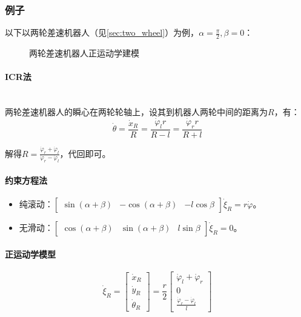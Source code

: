 \documentclass[
12pt, %
a4paper, 
oneside, %
headinclude,footinclude, %
]{scrartcl}
\begin{document}
\subsubsection{例子}\label{sec:example1}
以下以两轮差速机器人（见\ref{sec:two_wheel}）为例，$ \alpha = \frac{\pi}{2}, \beta = 0 $：
\begin{figure}[H]
\centering
{} \quad
{}
\caption[两轮差速机器人正运动学建模]{两轮差速机器人正运动学建模}
\end{figure}
\paragraph{ICR法}~\\

两轮差速机器人的瞬心在两轮轮轴上，设其到机器人两轮中间的距离为$ R $，有：
$$ \dot{\theta} = \frac{\dot{x}_R}{R} = \frac{\dot{\varphi}_l r}{R-l} = \frac{\dot{\varphi}_r r}{R+l} $$

解得$ R = \frac{\dot{\varphi}_r + \dot{\varphi}_l}{\dot{\varphi}_r - \dot{\varphi}_l} $，代回即可。
\paragraph{约束方程法}
\begin{itemize}
\item 纯滚动：$ \begin{bmatrix} \sin(\alpha + \beta) & -\cos(\alpha + \beta) & -l\cos\beta \end{bmatrix} \dot{\xi}_R = r\dot{\varphi} $。
\item 无滑动：$ \begin{bmatrix} \cos(\alpha + \beta) & \sin(\alpha + \beta) & l\sin\beta \end{bmatrix} \dot{\xi}_R = 0 $。
\end{itemize}
\paragraph{正运动学模型}
$$ \dot{\xi}_R = \begin{bmatrix} \dot{x}_R \\ \dot{y}_R \\ \dot{\theta}_R \end{bmatrix} = \frac{r}{2} \begin{bmatrix} \dot{\varphi}_l + \dot{\varphi}_r \\ 0 \\ \frac{\dot{\varphi}_r - \dot{\varphi}_l}{l} \end{bmatrix} $$
\end{document}

